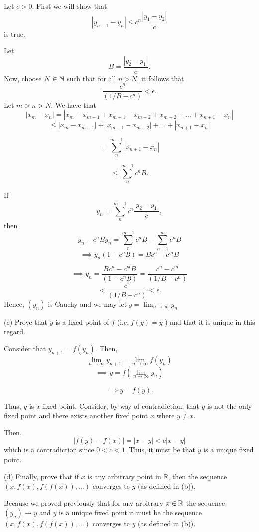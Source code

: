 \documentclass{report}
\begin{document}
\bigskip
\begin{myproof}
  Let $\epsilon > 0.$ First we will show that $$|y_{n+1} - y_n| \leq c^{n}\frac{|y_1 - y_2|}{c}$$ is true.

  Let $$B = \frac{|y_2 - y_1|}{c}.$$
  Now, choose $N \in \NN$ such that for all $n>N$, it follows that $$\frac{c^n}{(1/B  - c^{n})}< \epsilon.$$ Let  $m > n > N.$  We have that  
  $$ |x_m - x_n|= |x_m - x_{m-1} + x_{m-1} - x_{m-2} + x_{m-2} + \dots + x_{n+1}- x_n| $$
$$\leq |x_m - x_{m-1}| + |x_{m-1} - x_{m-2}| +  \dots + |x_{n+1}- x_n| $$

$$= \sum_{n}^{m-1}|x_{n+1} - x_n| $$

$$\leq \sum_{n}^{m-1}c^{n}B.$$

If $$y_n =\sum_{n}^{m-1} c^{n}\frac{|y_2 - y_1|}{c},$$ then $$y_n  - c^{n}By_n = \sum_{n}^{m-1} c^{n}B - \sum_{n+1}^{m} c^{n}B$$
$$\implies y_n(1  - c^{n}B) = Bc^n - c^mB $$

$$\implies y_n = \frac{Bc^n - c^mB }{(1  - c^{n}B)}= \frac{c^n - c^m }{(1/B  - c^{n})} $$
$$< \frac{c^n}{(1/B  - c^{n})} < \epsilon.$$
Hence, $(y_n)$ is Cauchy and we may let $y=\lim _{n \rightarrow \infty} y_n$
\end{myproof}

\par
\bigskip
(c) Prove that $y$ is a fixed point of $f$ (i.e. $f(y)=y$ ) and that it is unique in this regard.

\par

\begin{myproof}
    
\bigskip
Consider that $y_{n+1} = f(y_n).$ Then, $$ \lim_{n \rightarrow \infty} y_{n+1} = \lim_{n \rightarrow \infty}f(y_n)$$
$$\implies y=  f\left(\lim_{n \rightarrow \infty}y_n\right)$$

$$\implies  y = f(y).$$

Thus, $y$ is a fixed point. Consider, by way of contradiction, that $y$ is not the only fixed point and there exists another fixed point $x$ where $y\not=x.$

Then, $$|f(y) - f(x)| = |x-y| < c|x-y|$$ which is a contradiction since $0 < c < 1$. Thus, it must be that $y$ is a unique fixed point.

\end{myproof}
\bigskip
(d) Finally, prove that if $x$ is any arbitrary point in $\mathbb{R}$, then the sequence $(x, f(x), f(f(x)), \ldots)$ converges to $y$ (as defined in (b)).

\begin{myproof}
Because we proved previously that for any arbitrary $x \in \RR$ the sequence $(y_n) \rightarrow y$ and $y$ is a unique fixed point it must be the sequence $(x, f(x), f(f(x)), \ldots)$ converges to $y$ (as defined in (b)).
\end{myproof}
\end{document}
